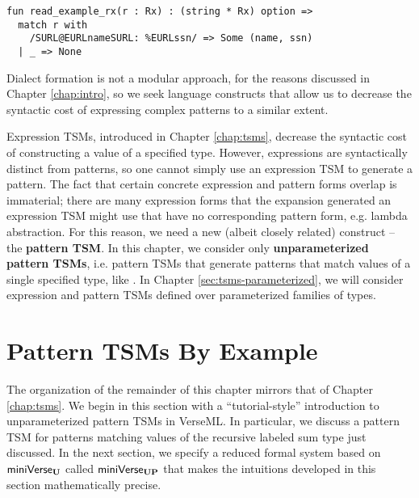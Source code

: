 \begin{lstlisting}
fun read_example_rx(r : Rx) : (string * Rx) option => 
  match r with 
    /SURL@EURLnameSURL: %EURLssn/ => Some (name, ssn)
  | _ => None\end{lstlisting}

Dialect formation is not a modular approach, for the reasons discussed in Chapter \ref{chap:intro}, so we seek language constructs that allow us to decrease the syntactic cost of expressing complex patterns to a similar extent.

Expression TSMs, introduced in Chapter \ref{chap:tsms}, decrease the syntactic cost of constructing a value of a specified type. However, expressions are syntactically distinct from patterns, so one cannot simply use an expression TSM to generate a pattern. The fact that certain concrete expression and pattern forms overlap is immaterial; there are many expression forms that the expansion generated an expression TSM might use that have no corresponding pattern form, e.g.  lambda abstraction. %
For this reason, we need a new (albeit closely related) construct -- the \textbf{pattern TSM}. In this chapter, we consider only \textbf{unparameterized pattern TSMs}, i.e. pattern TSMs that generate patterns that match values of a single specified type, like . In Chapter \ref{sec:tsms-parameterized}, we will consider expression and pattern TSMs defined over parameterized families of types. 

\section{Pattern TSMs By Example}\label{sec:ptsms-by-example}
The organization of the remainder of this chapter mirrors that of Chapter \ref{chap:tsms}. We begin in this section with a ``tutorial-style'' introduction to unparameterized pattern TSMs in VerseML. In particular, we  discuss a pattern TSM for patterns matching values of the recursive labeled sum type  just discussed. In the next section, we specify a reduced formal system based on $\mathsf{miniVerse}_\textbf{U}$ called $\mathsf{miniVerse}_\textbf{UP}$ that makes the intuitions developed in this section mathematically precise.

